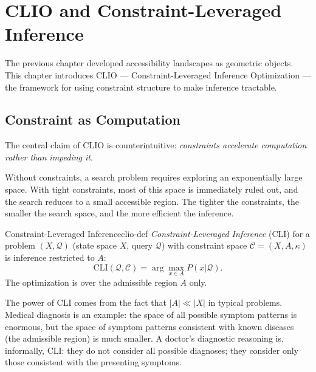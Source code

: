 
\chapter{CLIO and Constraint-Leveraged Inference}



The previous chapter developed accessibility landscapes as geometric
objects. This chapter introduces CLIO — Constraint-Leveraged Inference
Optimization — the framework for using constraint structure to make
inference tractable.

\section{Constraint as Computation}

The central claim of CLIO is counterintuitive: \emph{constraints
accelerate computation rather than impeding it}.

Without constraints, a search problem requires exploring an exponentially
large space. With tight constraints, most of this space is immediately
ruled out, and the search reduces to a small accessible region. The
tighter the constraints, the smaller the search space, and the more
efficient the inference.

\begin{definition}{Constraint-Leveraged Inference}{clio-def}
  \emph{Constraint-Leveraged Inference} (CLI) for a problem $(X, \mathcal{Q})$
  (state space $X$, query $\mathcal{Q}$) with constraint space
  $\mathcal{C} = (X, A, \kappa)$ is inference restricted to $A$:
  \[
    \mathrm{CLI}(\mathcal{Q}, \mathcal{C}) =
    \arg\max_{x \in A} P(x | \mathcal{Q}).
  \]
  The optimization is over the admissible region $A$ only.
\end{definition}

The power of CLI comes from the fact that $|A| \ll |X|$ in typical
problems. Medical diagnosis is an example: the space of all possible
symptom patterns is enormous, but the space of symptom patterns
consistent with known diseases (the admissible region) is much smaller.
A doctor's diagnostic reasoning is, informally, CLI: they do not
consider all possible diagnoses; they consider only those consistent
with the presenting symptoms.

